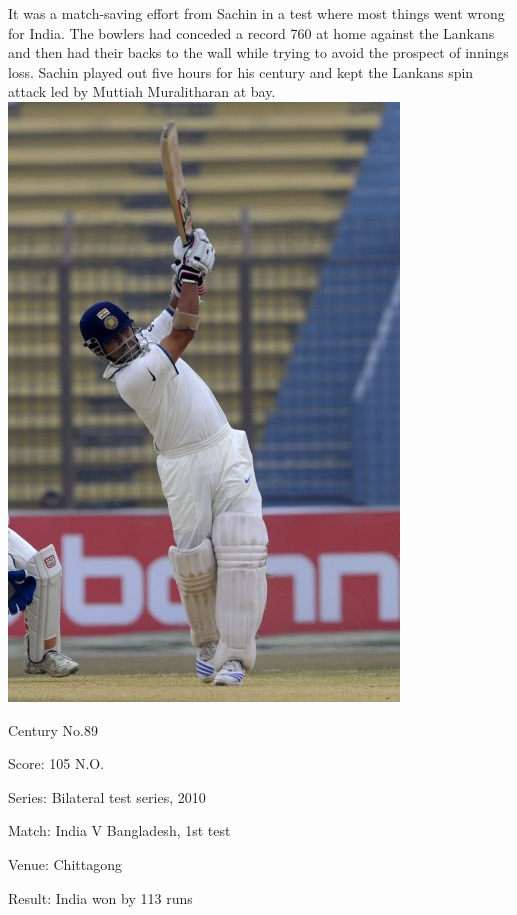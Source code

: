 \documentclass[11pt, a4paper]{article}
\begin{document}
It was a match-saving effort from Sachin in a test where most things went wrong for India. The bowlers had conceded a record 760 at home against the Lankans and then had their backs to the wall while trying to avoid the prospect of innings loss. Sachin played out five hours for his century and kept the Lankans spin attack led by Muttiah Muralitharan at bay.
\newpage
\includegraphics[height=0.8\textheight]{pics/89.jpg}

Century No.89 

Score: 105 N.O. 

Series: Bilateral test series, 2010 

Match: India V Bangladesh, 1st test 

Venue: Chittagong 

Result: India won by 113 runs 
\end{document}

